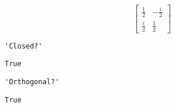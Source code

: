 \documentclass[11pt]{article}
\begin{document}
    
    $$\left[\begin{matrix}\frac{1}{2} & - \frac{i}{2}\\\frac{i}{2} & \frac{1}{2}\end{matrix}\right]$$

    
    
    \begin{verbatim}
'Closed?'
    \end{verbatim}

    
    
    \begin{verbatim}
True
    \end{verbatim}

    
    
    \begin{verbatim}
'Orthogonal?'
    \end{verbatim}

    
    
    \begin{verbatim}
True
    \end{verbatim}
\end{document}
